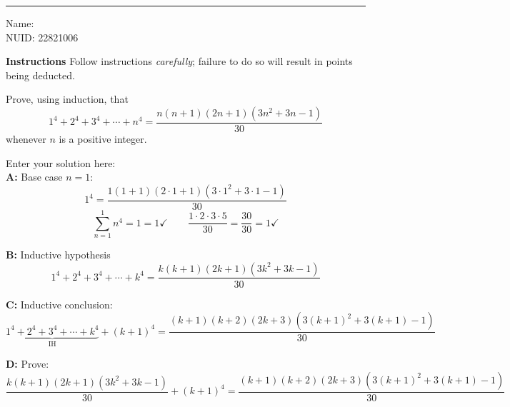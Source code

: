 \documentclass[10pt]{exam}
\begin{document}
\hrule

\vspace{.50cm} Name:
\\ NUID: 22821006
\vspace{.50cm}

\textbf{Instructions} Follow instructions \emph{carefully}; failure to do so will result in points being deducted. 

\begin{questions}


\question[8] Prove, using induction, that  
\[
1^4 + 2^4 + 3^4 + \cdots + n^4 = \frac{n(n+1)(2n+1)(3n^2+3n-1)}{30}
\]  
whenever \(n\) is a positive integer.

\begin{solution}
    Enter your solution here:\\
    \textbf{A:} Base case $n = 1$:
    \[1^4 = \frac{1(1+1)(2\cdot1+1)(3\cdot1^2+3\cdot1-1)}{30}\]
    \[\sum_{n=1}^{1} n^4 = 1 = 1 \checkmark \qquad \frac{1 \cdot 2 \cdot 3 \cdot 5}{30} = \frac{30}{30} = 1 \checkmark\]
    
    \textbf{B:} Inductive hypothesis
    \[1^4 + 2^4 + 3^4 + \cdots + k^4 = \frac{k(k+1)(2k+1)(3k^2+3k-1)}{30}\]
    
    \textbf{C:} Inductive conclusion:
    \[\underbrace{1^4 + 2^4 + 3^4 + \cdots + k^4}_{\text{IH}} + (k+1)^4
    = \frac{(k+1)(k+2)(2k+3)(3(k+1)^2+3(k+1)-1)}{30}\]
    
    \textbf{D:} Prove:
    \[\frac{k(k+1)(2k+1)(3k^2+3k-1)}{30} + (k+1)^4
    = \frac{(k+1)(k+2)(2k+3)(3(k+1)^2+3(k+1)-1)}{30}\]
    

\end{solution}
\end{questions}
\end{document}
